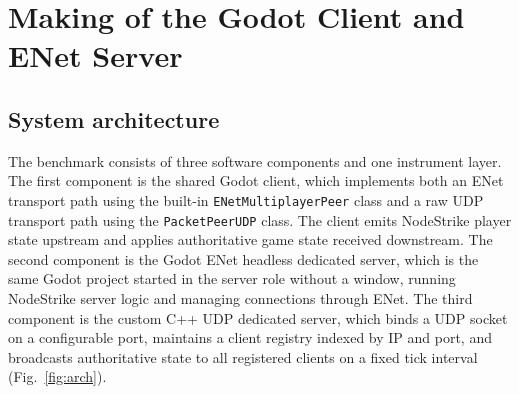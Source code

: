 \IfFileExists{IEEEtran.cls}{\ieeetrue\documentclass[conference]{IEEEtran}}{\ieeefalse\documentclass[twocolumn,10pt]{article}}
\begin{document}
\section{Making of the Godot Client and ENet Server}
\subsection{System architecture}
The benchmark consists of three software components and one instrument layer. The first component is the shared Godot client, which implements both an ENet transport path using the built-in \texttt{ENetMultiplayerPeer} class and a raw UDP transport path using the \texttt{PacketPeerUDP} class. The client emits NodeStrike player state upstream and applies authoritative game state received downstream. The second component is the Godot ENet headless dedicated server, which is the same Godot project started in the server role without a window, running NodeStrike server logic and managing connections through ENet. The third component is the custom C++ UDP dedicated server, which binds a UDP socket on a configurable port, maintains a client registry indexed by IP and port, and broadcasts authoritative state to all registered clients on a fixed tick interval (Fig.~\ref{fig:arch}).
\end{document}
